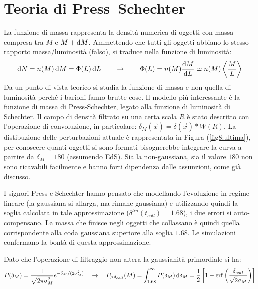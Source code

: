 \section{Teoria di Press–Schechter}
La funzione di massa rappresenta la densità numerica di oggetti con massa compresa tra $M$ e $M+\operatorname{d}\!{M}$. Ammettendo che tutti gli oggetti abbiano lo stesso rapporto massa/luminosità (falso), si traduce nella funzione di luminosità: 
\begin{equation}
    \operatorname{d}\!{N}=n(M)\operatorname{d}\!{M} = \Phi(L)\operatorname{d}\!{L} \qquad \rightarrow \qquad \Phi(L)=n(M)\frac{\operatorname{d}\!{M}}{\operatorname{d}\!{L}}\simeq n(M)\left\langle \frac{M}{L} \right\rangle 
\end{equation}
Da un punto di vista teorico si studia la funzione di massa e non quella di luminosità perché i barioni fanno brutte cose. Il modello più interessante è la funzione di massa di Press-Schechter, legato alla funzione di luminosità di Schechter. Il campo di densità filtrato su una certa scala $R$ è stato descritto con l'operazione di convoluzione, in particolare: $\delta_M (\vec{x})=\delta(\vec{x}) * W(R)$. La distibuzione delle perturbazioni attuale è rappresentata in Figura (\ref{fig8:ultima}), per conoscere quanti oggetti si sono formati bisognerebbe integrare la curva a partire da $\delta_M = 180$ (assumendo EdS). Sia la non-gaussiana, sia il valore $180$ non sono ricavabili facilmente e hanno forti dipendenza dalle assunzioni, come già discusso. 

I signori Press e Schechter hanno pensato che modellando l'evoluzione in regime lineare (la gaussiana si allarga, ma rimane gaussiana) e utilizzando quindi la soglia calcolata in tale approssimazione ($\delta^{lin}(t_{coll})=1.68$), i due errori si auto-compensano. La massa che finisce negli oggetti che collassano è quindi quella corrispondente alla coda gaussiana superiore alla soglia $1.68$. Le simulazioni confermano la bontà di questa approssimazione.

Dato che l'operazione di filtraggio non altera la gaussianità primordiale si ha:
\begin{equation*}
    P(\delta_M)=\frac{1}{\sqrt{2\pi \sigma_M^2}}e^{-\delta_M / (2\sigma_M^2)}\quad \to \quad P_{>\delta_{coll}}(M)=\int_{1.68}^\infty P(\delta_M)\operatorname{d}\!{\delta_M}= \frac{1}{2}\left[1-\mathrm{erf}\left(\frac{\delta_{coll}}{\sqrt{2}\sigma_M}\right)\right]
\end{equation*}

